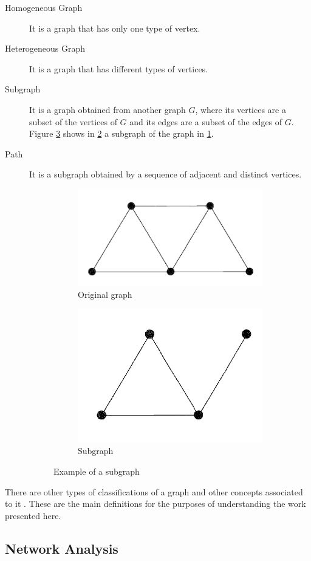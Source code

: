 \begin{description}
\item[Homogeneous Graph] It is a graph that has only one type of vertex.
\item[Heterogeneous Graph] It is a graph that has different types of vertices.
\item[Subgraph] It is a graph obtained from another graph $G$, where its vertices are a subset of the vertices of $G$ and its edges are a subset of the edges of $G$. Figure \ref{fig:figure9} shows in \ref{fig:figure9subfig2} a subgraph of the graph in \ref{fig:figure9subfig1}.
\item[Path] It is a subgraph obtained by a sequence of adjacent and distinct vertices.

\begin{figure}[ht]
\centering
\begin{subfigure}{.4\textwidth}
	\centering
	\includegraphics[width=.5\textwidth]{../subgraph_example_1.png}
	\caption{Original graph}
	\label{fig:figure9subfig1}
\end{subfigure} %
\begin{subfigure} {.4\textwidth}
	\centering
	\includegraphics[width=.5\textwidth]{../subgraph_example_2.png}
	\caption{Subgraph}
	\label{fig:figure9subfig2}
\end{subfigure}
\caption{Example of a subgraph \cite{Tobergte2013}}
\label{fig:figure9}
\end{figure}
\end{description}
There are other types of classifications of a graph and other concepts associated to it \cite{Tobergte2013}. These are the main definitions for the purposes of understanding the work presented here.

\subsection{Network Analysis}

